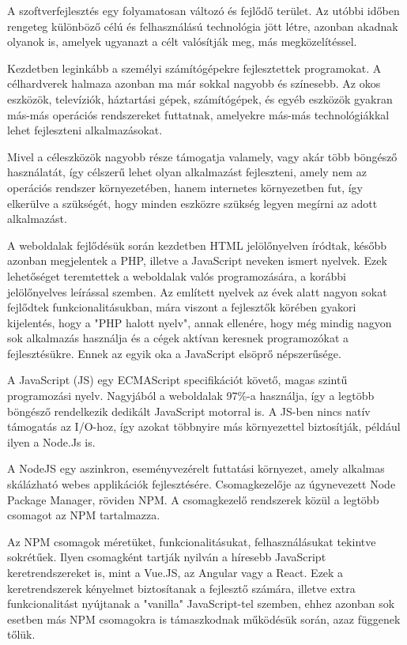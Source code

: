 
A szoftverfejlesztés egy folyamatosan változó és fejlődő terület. Az utóbbi időben rengeteg különböző célú és felhasználású technológia jött létre, azonban akadnak olyanok is, amelyek ugyanazt a célt valósítják meg, más megközelítéssel.

Kezdetben leginkább a személyi számítógépekre fejlesztettek programokat. A célhardverek halmaza azonban ma már sokkal nagyobb és színesebb. Az okos eszközök, televíziók, háztartási gépek, számítógépek, és egyéb eszközök gyakran más-más operációs rendszereket futtatnak, amelyekre más-más technológiákkal lehet fejleszteni alkalmazásokat.

Mivel a céleszközök nagyobb része támogatja valamely, vagy akár több böngésző használatát, így célszerű lehet olyan alkalmazást fejleszteni, amely nem az operációs rendszer környezetében, hanem internetes környezetben fut, így elkerülve a szükségét, hogy minden eszközre szükség legyen megírni az adott alkalmazást.

A weboldalak fejlődésük során kezdetben HTML jelölőnyelven íródtak, később azonban megjelentek a PHP, illetve a JavaScript neveken ismert nyelvek. Ezek  lehetőséget teremtettek a weboldalak valós programozására, a korábbi jelölőnyelves leírással szemben. Az említett nyelvek az évek alatt nagyon sokat fejlődtek funkcionalitásukban, mára viszont a fejlesztők körében gyakori kijelentés, hogy a "PHP halott nyelv", annak ellenére, hogy még mindig nagyon sok alkalmazás használja és a cégek aktívan keresnek programozókat a fejlesztésükre. Ennek az egyik oka a JavaScript elsöprő népszerűsége.

A  JavaScript (JS) egy ECMAScript specifikációt követő, magas szintű programozási nyelv. Nagyjából a weboldalak 97\%-a használja, így a legtöbb böngésző rendelkezik dedikált JavaScript motorral is. A JS-ben nincs natív támogatás az I/O-hoz, így azokat többnyire más környezettel biztosítják, például ilyen a Node.Js is. \cite{javascript}

A NodeJS egy aszinkron, eseményvezérelt futtatási környezet, amely alkalmas skálázható webes applikációk fejlesztésére. Csomagkezelője az úgynevezett Node Package Manager, röviden NPM. A csomagkezelő rendszerek közül a legtöbb csomagot az NPM tartalmazza.

Az NPM csomagok méretüket, funkcionalitásukat, felhasználásukat tekintve sokrétűek. Ilyen csomagként tartják nyilván a híresebb JavaScript keretrendszereket is, mint a Vue.JS, az Angular vagy a React. Ezek a keretrendszerek kényelmet biztosítanak a fejlesztő számára, illetve extra funkcionalitást nyújtanak a "vanilla" JavaScript-tel szemben, ehhez azonban sok esetben más NPM csomagokra is támaszkodnak működésük során, azaz függenek tőlük.

